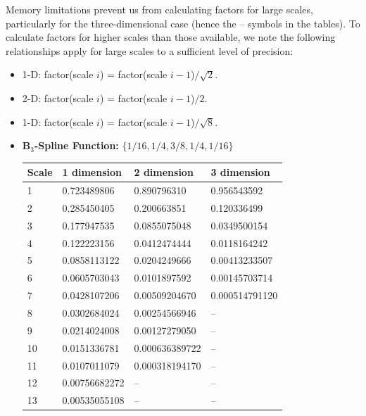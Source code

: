 \documentclass[12pt,a4paper]{article}
\begin{document}
Memory limitations prevent us from calculating factors for large
scales, particularly for the three-dimensional case (hence the --
symbols in the tables). To calculate factors for
higher scales than those available, we note the following
relationships apply for large scales to a sufficient level of precision:
\begin{itemize}
\item 1-D: factor(scale $i$) = factor(scale $i-1$)$/\sqrt{2}$.
\item 2-D: factor(scale $i$) = factor(scale $i-1$)$/2$.
\item 1-D: factor(scale $i$) = factor(scale $i-1$)$/\sqrt{8}$.
\end{itemize}

\newpage
\begin{itemize}
\item \textbf{B$_3$-Spline Function:} $\{1/16,1/4,3/8,1/4,1/16\}$

\begin{tabular}{llll}
Scale & 1 dimension      & 2 dimension     & 3 dimension\\ \hline
1     & 0.723489806      & 0.890796310     & 0.956543592\\
2     & 0.285450405	 & 0.200663851	   & 0.120336499\\
3     & 0.177947535	 & 0.0855075048	   & 0.0349500154\\
4     & 0.122223156	 & 0.0412474444	   & 0.0118164242\\
5     & 0.0858113122	 & 0.0204249666	   & 0.00413233507\\
6     & 0.0605703043	 & 0.0101897592	   & 0.00145703714\\
7     & 0.0428107206	 & 0.00509204670   & 0.000514791120\\
8     & 0.0302684024	 & 0.00254566946   & --\\
9     & 0.0214024008	 & 0.00127279050   & --\\
10    & 0.0151336781	 & 0.000636389722  & --\\
11    & 0.0107011079	 & 0.000318194170  & --\\
12    & 0.00756682272	 & --		   & --\\
13    & 0.00535055108	 & --		   & --\\
\end{tabular}


\end{itemize}
\end{document}
